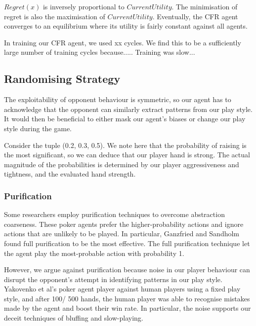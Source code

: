 \documentclass{article}
\begin{document}

$Regret(x)$ is inversely proportional to $CurrentUtility$. The minimisation of regret is also the maximisation of $CurrentUtility$. Eventually, the CFR agent converges to an equilibrium where its utility is fairly constant against all agents.

In training our CFR agent, we used xx cycles. We find this to be a sufficiently large number of training cycles because..... Training was slow...

\subsection{Randomising Strategy}

The exploitability of opponent behaviour is symmetric, so our agent has to acknowledge that the opponent can similarly extract patterns from our play style. It would then be beneficial to either mask our agent's biases or change our play style during the game.

Consider the tuple (0.2, 0.3, 0.5). We note here that the probability of raising is the most significant, so we can deduce that our player hand is strong. The actual magnitude of the probabilities is determined by our player aggressiveness and tightness, and the evaluated hand strength.

\subsubsection{Purification}

Some researchers employ purification techniques to overcome abstraction coarseness. These poker agents prefer the higher-probability actions and ignore actions that are unlikely to be played. In particular, Ganzfried and Sandholm found full purification to be the most effective. The full purification technique let the agent play the most-probable action with probability 1.

However, we argue against purification because noise in our player behaviour can disrupt the opponent's attempt in identifying patterns in our play style. Yakovenko et al's poker agent player against human players using a fixed play style, and after 100/ 500 hands, the human player was able to recognise mistakes made by the agent and boost their win rate. In particular, the noise supports our deceit techniques of bluffing and slow-playing.
\end{document}

